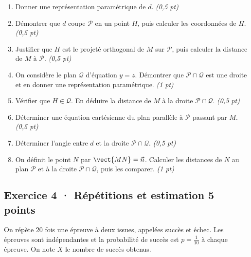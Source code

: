 \begin{enumerate}

\item Donner une représentation paramétrique de $d$. \hfill\textit{(0{,}5 pt)}

\item Démontrer que $d$ coupe $\mathcal P$ en un point $H$, puis calculer les coordonnées de $H$. \hfill\textit{(0{,}5 pt)}

\item Justifier que $H$ est le projeté orthogonal de $M$ sur $\mathcal P$, puis calculer la distance de $M$ à $\mathcal P$. \hfill\textit{(0{,}5 pt)}

\item On considère le plan $\mathcal Q$ d'équation $y=z$. Démontrer que $\mathcal P\cap\mathcal Q$ est une droite et en donner une représentation paramétrique. \hfill\textit{(1 pt)}

\item Vérifier que $H\in\mathcal Q$. En déduire la distance de $M$ à la droite $\mathcal P\cap\mathcal Q$. \hfill\textit{(0{,}5 pt)}

\item Déterminer une équation cartésienne du plan parallèle à $\mathcal P$ passant par $M$. \hfill\textit{(0{,}5 pt)}

\item Déterminer l'angle entre $d$ et la droite $\mathcal P\cap\mathcal Q$. \hfill\textit{(0{,}5 pt)}

\item On définit le point $N$ par $\vect{MN}=\vec n$. Calculer les distances de $N$ au plan $\mathcal P$ et à la droite $\mathcal P\cap\mathcal Q$, puis les comparer. \hfill\textit{(1 pt)}

\end{enumerate}

\subsection*{Exercice 4 · Répétitions et estimation \hfill 5 points}On répète $20$ fois une épreuve à deux issues, appelées succès et échec. Les épreuves sont indépendantes et la probabilité de succès est $p=\frac{1}{10}$ à chaque épreuve. On note $X$ le nombre de succès obtenus.

